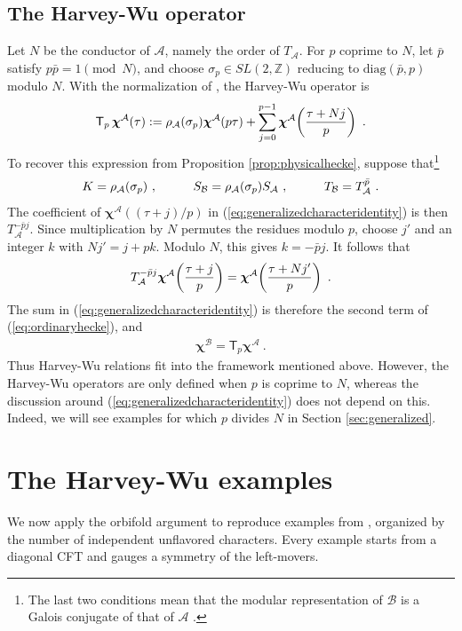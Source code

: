 \documentclass[12pt]{article}
\numberwithin{equation}{section}
\newcommand{\bea}{\begin{eqnarray}}
\newcommand{\eea}{\end{eqnarray}}
\def\ZZ{\mathbb{Z}}
\def\cA{\mathcal{A}}
\def\cB{\mathcal{B}}
\theoremstyle{remark}
\begin{document}
\subsection{The Harvey-Wu operator}

Let $N$ be the conductor of $\cA$, namely the order of $T_{\cA}$. For $p$ coprime to $N$, let $\bar p$ satisfy $p\bar p=1\pmod N$, and choose $\sigma_p\in SL(2,\ZZ)$ reducing to $\mathrm{diag}(\bar p,p)$ modulo $N$. With the normalization of \cite{Harvey:2018rdc}, the Harvey-Wu operator is
\bea 
\label{eq:ordinaryhecke}
\mathsf T_p\,\boldsymbol{\chi}^{\cA}(\tau):=\rho_{\cA}(\sigma_p)\boldsymbol{\chi}^{\cA}(p\tau)+\sum_{j=0}^{p-1}\boldsymbol{\chi}^{\cA}\!\left({\tau+Nj\over p}\right)~.
\eea
To recover this expression from Proposition \ref{prop:physicalhecke}, suppose that\footnote{The last two conditions mean that the modular representation of $\cB$ is a Galois conjugate of that of $\cA$ \cite{Bantay:2001ni,Harvey:2018rdc,Harvey:2019qzs}. 
}
\bea 
\label{eq:ordinarycompatibility}
K=\rho_{\cA}(\sigma_p)~, \hspace{0.4 in} S_{\cB}=\rho_{\cA}(\sigma_p) S_{\cA}~,\hspace{0.4 in}T_{\cB}=T_{\cA}^{\bar p}~.
\eea
The coefficient of $\boldsymbol{\chi}^{\cA}((\tau+j)/p)$ in (\ref{eq:generalizedcharacteridentity}) is then $T_{\cA}^{-\bar p j}$. Since multiplication by $N$ permutes the residues modulo $p$, choose $j'$ and an integer $k$ with $Nj'=j+pk$. Modulo $N$, this gives $k=-\bar p j$. It follows that
\bea
\label{eq:reindexing}
T_{\cA}^{-\bar p j}\boldsymbol{\chi}^{\cA}\!\left({\tau+j\over p}\right)=\boldsymbol{\chi}^{\cA}\!\left({\tau+Nj'\over p}\right)~.
\eea
The sum in (\ref{eq:generalizedcharacteridentity}) is therefore the second term of (\ref{eq:ordinaryhecke}), and
\bea
\boldsymbol{\chi}^{\cB}=\mathsf T_p\boldsymbol{\chi}^{\cA}~.
\eea
Thus Harvey-Wu relations fit into the framework mentioned above. However, the Harvey-Wu operators are only defined when $p$ is coprime to $N$, whereas the discussion around (\ref{eq:generalizedcharacteridentity}) does not depend on this. Indeed, we will see examples for which $p$ divides $N$ in Section \ref{sec:generalized}. 

\section{The Harvey-Wu examples}
\label{sec:HarveyWu}

We now apply the orbifold argument to reproduce examples from \cite{Harvey:2018rdc}, organized by the number of independent unflavored characters. Every example starts from a diagonal CFT and gauges a symmetry of the left-movers.
\end{document}

